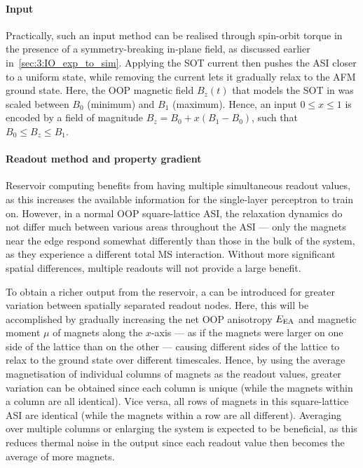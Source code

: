 \paragraph{Input}
Practically, such an input method can be realised through spin-orbit torque in the presence of a symmetry-breaking in-plane field, as discussed earlier in~\cref{sec:3:IO_exp_to_sim}.
Applying the SOT current then pushes the ASI closer to a uniform state, while removing the current lets it gradually relax to the AFM ground state.
Here, the OOP magnetic field $B_z(t)$ that models the SOT in \hotspice was scaled between $B_0$ (minimum) and $B_1$ (maximum).
Hence, an input $0 \leq x \leq 1$ is encoded by a field of magnitude $B_z = B_0 + x (B_1 - B_0)$, such that $B_0 \leq B_z \leq B_1$.

\paragraph{Readout method and property gradient}
Reservoir computing benefits from having multiple simultaneous readout values, as this increases the available information for the single-layer perceptron to train on.
However, in a normal OOP square-lattice ASI, the relaxation dynamics do not differ much between various areas throughout the ASI --- only the magnets near the edge respond somewhat differently than those in the bulk of the system, as they experience a different total MS interaction.
Without more significant spatial differences, multiple readouts will not provide a large benefit. \\\par
To obtain a richer output from the reservoir, a  can be introduced for greater variation between spatially separated readout nodes. %
Here, this will be accomplished by gradually increasing the net OOP anisotropy $E_\mathrm{EA}$ and magnetic moment $\mu$ of magnets along the $x$-axis --- as if the magnets were larger on one side of the lattice than on the other --- causing different sides of the lattice to relax to the ground state over different timescales.
Hence, by using the average magnetisation of individual columns of magnets as the readout values, greater variation can be obtained since each column is unique (while the magnets within a column are all identical).
Vice versa, all rows of magnets in this square-lattice ASI are identical (while the magnets within a row are all different).
Averaging over multiple columns or enlarging the system is expected to be beneficial, as this reduces thermal noise in the output since each readout value then becomes the average of more magnets.

